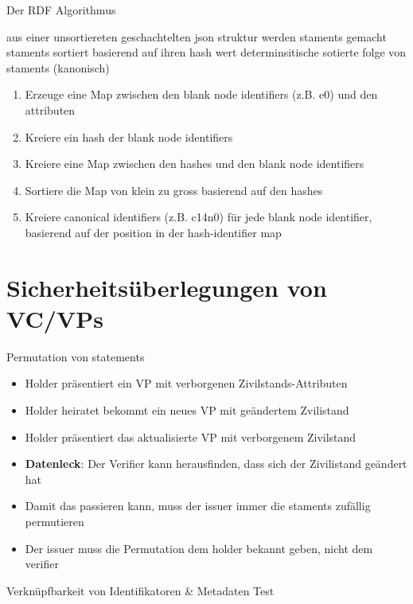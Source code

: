 \documentclass[
	german,%
	authorontitle=true,
	]{bfhbeamer}
\begin{document}
\begin{frame}{Der RDF Algorithmus}

    aus einer unsortiereten geschachtelten json struktur werden staments gemacht
    staments sortiert basierend auf ihren hash wert
    determinsitische sotierte folge von staments (kanonisch)


    \begin{enumerate}
        \item Erzeuge eine Map zwischen den blank node identifiers (z.B. e0) und den attributen
        \item Kreiere ein hash der blank node identifiers
        \item Kreiere eine Map zwischen den hashes und den blank node identifiers
        \item Sortiere die Map von klein zu gross basierend auf den hashes
        \item Kreiere canonical identifiers (z.B. c14n0) für jede blank node identifier, basierend auf der position in der hash-identifier map
    \end{enumerate}
\end{frame}

\section{Sicherheitsüberlegungen von VC/VPs}

\begin{frame}{Permutation von statements}
    \begin{itemize}
        \item Holder präsentiert ein VP mit verborgenen Zivilstands-Attributen
        \item Holder heiratet bekommt ein neues VP mit geändertem Zvilistand
        \item Holder präsentiert das aktualisierte VP mit verborgenem Zivilstand
        \item \textbf{Datenleck}: Der Verifier kann herausfinden, dass sich der Zivilistand geändert hat
        \item Damit das passieren kann, muss der issuer immer die staments zufällig permutieren
        \item Der issuer muss die Permutation dem holder bekannt geben, nicht dem verifier
    \end{itemize}
\end{frame}

\begin{frame}{Verknüpfbarkeit von Identifikatoren \& Metadaten}
    Test
\end{frame}
\end{document}

